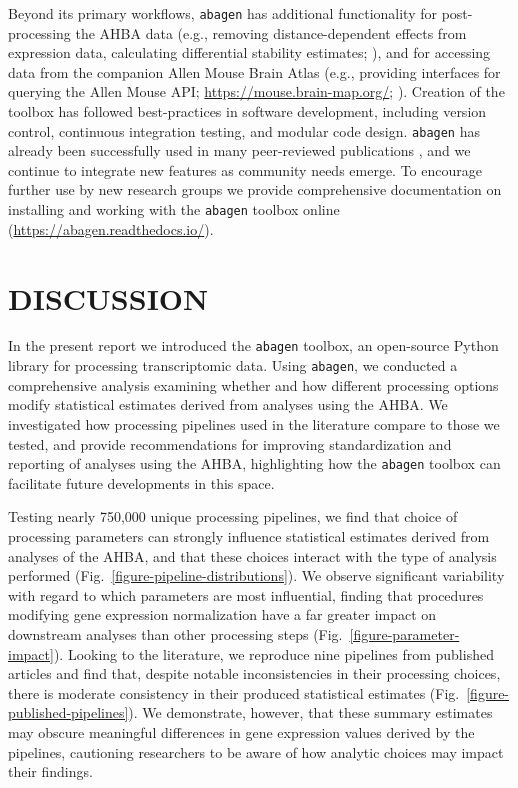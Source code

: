 \documentclass[12pt,aps,pra,reprint,showkeys]{revtex4-1}
\begin{document}
Beyond its primary workflows, \texttt{abagen} has additional functionality for post-processing the AHBA data (e.g., removing distance-dependent effects from expression data, calculating differential stability estimates; \citealt{hawrylycz2015natneuro}), and for accessing data from the companion Allen Mouse Brain Atlas (e.g., providing interfaces for querying the Allen Mouse API; \url{https://mouse.brain-map.org/}; \citealt{lein2007genome}).
Creation of the toolbox has followed best-practices in software development, including version control, continuous integration testing, and modular code design.
\texttt{abagen} has already been successfully used in many peer-reviewed publications \citep{shafiei2020elife, hansen2021nathumbeh, shafieibazinet2021biorxiv, brown2021biorxiv, park2021elife, valk2021biorxiv, zhao2020biorxiv, benkarim2020biorxiv, ding2021cercor, park2020biorxiv, lariviere2020biorxiv, martins2021biorxiv}, and we continue to integrate new features as community needs emerge.
To encourage further use by new research groups we provide comprehensive documentation on installing and working with the \texttt{abagen} toolbox online (\url{https://abagen.readthedocs.io/}).

\section*{DISCUSSION}

In the present report we introduced the \texttt{abagen} toolbox, an open-source Python library for processing transcriptomic data.
Using \texttt{abagen}, we conducted a comprehensive analysis examining whether and how different processing options modify statistical estimates derived from analyses using the AHBA.
We investigated how processing pipelines used in the literature compare to those we tested, and provide recommendations for improving standardization and reporting of analyses using the AHBA, highlighting how the \texttt{abagen} toolbox can facilitate future developments in this space.

Testing nearly 750,000 unique processing pipelines, we find that choice of processing parameters can strongly influence statistical estimates derived from analyses of the AHBA, and that these choices interact with the type of analysis performed (Fig.~\ref{figure-pipeline-distributions}).
We observe significant variability with regard to which parameters are most influential, finding that procedures modifying gene expression normalization have a far greater impact on downstream analyses than other processing steps (Fig.~\ref{figure-parameter-impact}).
Looking to the literature, we reproduce nine pipelines from published articles and find that, despite notable inconsistencies in their processing choices, there is moderate consistency in their produced statistical estimates (Fig.~\ref{figure-published-pipelines}).
We demonstrate, however, that these summary estimates may obscure meaningful differences in gene expression values derived by the pipelines, cautioning researchers to be aware of how analytic choices may impact their findings.
\end{document}
